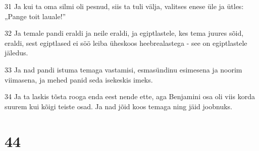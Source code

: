 \par 31 Ja kui ta oma silmi oli pesnud, siis ta tuli välja, valitses enese üle ja ütles: „Pange toit lauale!”
\par 32 Ja temale pandi eraldi ja neile eraldi, ja egiptlastele, kes tema juures sõid, eraldi, sest egiptlased ei söö leiba üheskoos heebrealastega - see on egiptlastele jäledus.
\par 33 Ja nad pandi istuma temaga vastamisi, esmasündinu esimesena ja noorim viimasena, ja mehed panid seda isekeskis imeks.
\par 34 Ja ta laskis tõsta rooga enda eest nende ette, aga Benjamini osa oli viis korda suurem kui kõigi teiste osad. Ja nad jõid koos temaga ning jäid joobnuks.

\chapter{44}

